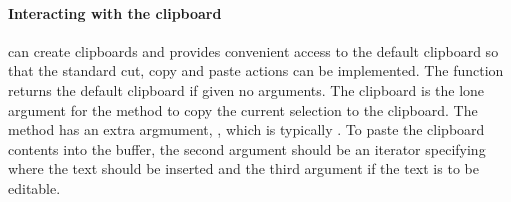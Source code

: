 \paragraph{Interacting with the clipboard}
\GTK\/ can create clipboards and provides convenient access to the
default clipboard so that the standard cut, copy and paste actions can
be implemented. The function  returns the
default clipboard if given no arguments. The clipboard is the lone argument for
the method  to copy the current
selection to the clipboard. The method
 has an extra argmument,
, which is typically . To paste the
clipboard contents into the buffer, the second argument should be an
iterator specifying where the text should be inserted and the third
argument  if the text is to be editable.


